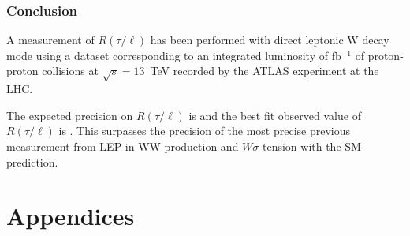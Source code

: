 \documentclass[NOTE, atlasdraft=true, texlive=2016, UKenglish]{\ATLASLATEXPATH atlasdoc}
\begin{document}
% 

\section{Conclusion}
\label{sec:conclusion}

A measurement of $R(\tau/\ell)$ has been performed with direct leptonic W decay mode using a dataset corresponding to an integrated luminosity of fb$^{-1}$ of proton-proton collisions at $\sqrt{s} = 13$~TeV recorded by the ATLAS experiment at the LHC.

The expected precision on $R(\tau/\ell)$ is  and the best fit observed value of $R(\tau/\ell)$ is . 
This surpasses the precision of the most precise previous measurement from LEP in WW production and  $W\sigma$ tension with the SM prediction.

\printbibliography
%
%

\clearpage
{}


\clearpage
\appendix
\part*{Appendices}

% 
\end{document}
